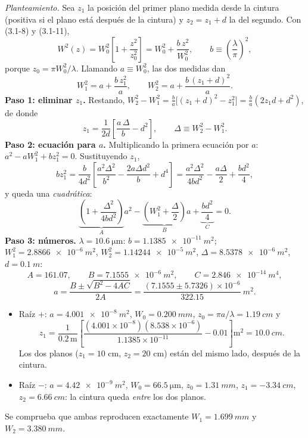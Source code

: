 
\label{sol:9}

\emph{Planteamiento.} Sea $z_1$ la posición del primer plano medida desde la cintura (positiva si
el plano está después de la cintura) y $z_2=z_1+d$ la del segundo. Con (3.1-8) y (3.1-11),
\[
W^2(z)=W_0^2\left[1+\frac{z^2}{z_0^2}\right]=W_0^2+\frac{b\,z^2}{W_0^2},
\qquad b\equiv\left(\frac{\lambda}{\pi}\right)^2,
\]
porque $z_0=\pi W_0^2/\lambda$. Llamando $a\equiv W_0^2$, las dos medidas dan
\[
W_1^2=a+\frac{b\,z_1^2}{a},\qquad W_2^2=a+\frac{b\,(z_1+d)^2}{a}.
\]
\textbf{Paso 1: eliminar $z_1$.} Restando,
$W_2^2-W_1^2=\frac{b}{a}\big[(z_1+d)^2-z_1^2\big]=\frac{b}{a}(2z_1d+d^2)$, de donde
\[
z_1=\frac{1}{2d}\left[\frac{a\,\Delta}{b}-d^2\right],\qquad \Delta\equiv W_2^2-W_1^2 .
\]
\textbf{Paso 2: ecuación para $a$.} Multiplicando la primera ecuación por $a$:
$a^2-aW_1^2+bz_1^2=0$. Sustituyendo $z_1$,
\[
bz_1^2=\frac{b}{4d^2}\left[\frac{a^2\Delta^2}{b^2}-\frac{2a\Delta d^2}{b}+d^4\right]
=\frac{a^2\Delta^2}{4bd^2}-\frac{a\Delta}{2}+\frac{bd^2}{4},
\]
y queda una \emph{cuadrática}:
\[
\underbrace{\left(1+\frac{\Delta^2}{4bd^2}\right)}_{A}a^2-\underbrace{\left(W_1^2+\frac{\Delta}{2}\right)}_{B}a+\underbrace{\frac{bd^2}{4}}_{C}=0 .
\]
\textbf{Paso 3: números.} $\lambda=\SI{10.6}{\um}$: $b=\SI{1.1385e-11}{m^2}$;
$W_1^2=\SI{2.8866e-6}{m^2}$, $W_2^2=\SI{1.14244e-5}{m^2}$, $\Delta=\SI{8.5378e-6}{m^2}$, $d=\SI{0.1}{m}$:
\[
A=161.07,\qquad B=\SI{7.1555e-6}{m^2},\qquad C=\SI{2.846e-14}{m^4},
\]
\[
a=\frac{B\pm\sqrt{B^2-4AC}}{2A}=\frac{(7.1555\pm5.7326)\times10^{-6}}{322.15}\ \si{m^2}.
\]
\begin{itemize}
\item Raíz $+$: $a=\SI{4.001e-8}{m^2}$, $W_0=\SI{0.200}{mm}$, $z_0=\pi a/\lambda=\SI{1.19}{cm}$ y
\[z_1=\frac{1}{0.2\,\mathrm{m}}\left[\frac{(4.001\times10^{-8})(8.538\times10^{-6})}{1.1385\times10^{-11}}-0.01\right]\mathrm{m^2}=\SI{+10.0}{cm}.\]
Los dos planos ($z_1=10$ cm, $z_2=20$ cm) están del mismo lado, después de la cintura.
\item Raíz $-$: $a=\SI{4.42e-9}{m^2}$, $W_0=\SI{66.5}{\um}$, $z_0=\SI{1.31}{mm}$, $z_1=\SI{-3.34}{cm}$,
$z_2=\SI{+6.66}{cm}$: la cintura queda \emph{entre} los dos planos.
\end{itemize}
Se comprueba que ambas reproducen exactamente $W_1=\SI{1.699}{mm}$ y $W_2=\SI{3.380}{mm}$.

